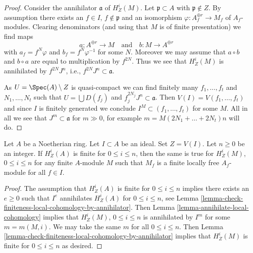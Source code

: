 \begin{proof}
Consider the annihilator $\mathfrak a$ of $H^i_Z(M)$.
Let $\mathfrak p \subset A$ with $\mathfrak p \not \in Z$.
By assumption there exists an $f \in I$, $f \not \in \mathfrak p$
and an isomorphism $\varphi : A_f^{\oplus r} \to M_f$
of $A_f$-modules. Clearing denominators (and using that
$M$ is of finite presentation) we find maps
$$
a : A^{\oplus r} \longrightarrow M
\quad\text{and}\quad
b : M \longrightarrow A^{\oplus r}
$$
with $a_f = f^N \varphi$ and $b_f = f^N \varphi^{-1}$ for some $N$.
Moreover we may assume that $a \circ b$ and $b \circ a$ are equal to
multiplication by $f^{2N}$. Thus we see that $H^i_Z(M)$ is annihilated by
$f^{2N}J^n$, i.e., $f^{2N}J^n \subset \mathfrak a$.

\medskip\noindent
As $U = \Spec(A) \setminus Z$ is quasi-compact we can find finitely many
$f_1, \ldots, f_t$ and $N_1, \ldots, N_t$ such that $U = \bigcup D(f_j)$ and
$f_j^{2N_j}J^n \subset \mathfrak a$. Then $V(I) = V(f_1, \ldots, f_t)$
and since $I$ is finitely generated we conclude
$I^M \subset (f_1, \ldots, f_t)$ for some $M$.
All in all we see that $J^m \subset \mathfrak a$ for
$m \gg 0$, for example $m = M (2N_1 + \ldots + 2N_t) n$ will do.
\end{proof}

\begin{lemma}
\label{lemma-local-finiteness-for-finite-locally-free}
Let $A$ be a Noetherian ring. Let $I \subset A$ be an ideal. Set $Z = V(I)$.
Let $n \geq 0$ be an integer. If $H^i_Z(A)$ is finite for $0 \leq i \leq n$,
then the same is true for $H^i_Z(M)$, $0 \leq i \leq n$ for
any finite $A$-module $M$ such that $M_f$ is a finite locally free
$A_f$-module for all $f \in I$.
\end{lemma}

\begin{proof}
The assumption that $H^i_Z(A)$ is finite for $0 \leq i \leq n$
implies there exists an $e \geq 0$ such that $I^e$ annihilates
$H^i_Z(A)$ for $0 \leq i \leq n$, see
Lemma \ref{lemma-check-finiteness-local-cohomology-by-annihilator}.
Then Lemma \ref{lemma-annihilate-local-cohomology}
implies that $H^i_Z(M)$, $0 \leq i \leq n$ is annihilated
by $I^m$ for some $m = m(M, i)$. We may take the same $m$
for all $0 \leq i \leq n$. Then
Lemma \ref{lemma-check-finiteness-local-cohomology-by-annihilator}
implies that $H^i_Z(M)$ is finite for $0 \leq i \leq n$
as desired.
\end{proof}





